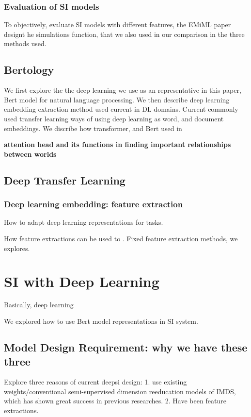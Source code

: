 \documentclass[manuscript,screen]{acmart}
\begin{document}
\subsubsection{Evaluation of SI models}
To objectively, evaluate SI models with different features, the EMiML paper designt he simulations function, that we also used in our comparison in the three methods used. 


\subsection{Bertology}

We first explore the the deep learning we use as an representative in this paper, Bert model for natural language processing. We then describe deep learning embedding extraction method used current in DL domains. 
Current commonly used transfer learning ways of using deep learning as word, and document embeddings. 
We discribe how transformer, and Bert used in 

\textbf{attention head and its functions in finding important relationships between worlds}



\subsection{Deep Transfer Learning}
\subsubsection{Deep learning embedding: feature extraction}

How to adapt deep learning representations for tasks. 

How feature extractions can be used to . 
Fixed feature extraction methods, we explores. 


\section{SI with Deep Learning}
Basically, deep learning 

We explored how to use Bert model representations in SI system. 

\subsection{Model Design Requirement: why we have these three}

Explore three reasons of current deepsi design: 
1. use existing weights/conventional semi-supervised dimension reeducation models of IMDS, which has shown great success in previous researches. 
2. Have been feature extractions. 
\end{document}
